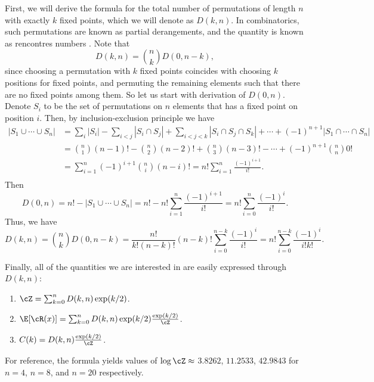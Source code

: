 First, we will derive the formula for the total number of permutations of length $n$ with exactly $k$ fixed points, which we will denote as $D(k, n)$. In combinatorics, such permutations are known as partial derangements, and the quantity is known as rencontres numbers \citep[p.180]{comtet1974advanced}. Note that 
$$D(k, n) = \binom{n}{k}D(0, n-k),$$
since choosing a permutation with $k$ fixed points coincides with choosing $k$ positions for fixed points, and permuting the remaining elements such that there are no fixed points among them. So let us start with derivation of $D(0, n)$. Denote $S_i$ to be the set of permutations on $n$ elements that has a fixed point on position $i$. Then, by inclusion-exclusion principle we have 
\begin{equation*}
\begin{split}
    \left|S_1 \cup \cdots \cup S_n\right| & =\sum_i\left|S_i\right|-\sum_{i<j}\left|S_i \cap S_j\right|+\sum_{i<j<k}\left|S_i \cap S_j \cap S_k\right|+\cdots+(-1)^{n+1}\left|S_1 \cap \cdots \cap S_n\right| \\
    & =\binom{n}{1}(n-1)!-\binom{n}{2}(n-2)!+\binom{n}{3}(n-3)!-\cdots+(-1)^{n+1}\binom{n}{n} 0! \\
    & =\sum_{i=1}^n(-1)^{i+1}\binom{n}{i}(n-i)! = n!\sum_{i=1}^n \frac{(-1)^{i+1}}{i!}.\\
\end{split}
\end{equation*}
Then 
$$D(0, n) = n! - \left|S_1 \cup \cdots \cup S_n\right| = n! - n!\sum_{i=1}^n \frac{(-1)^{i+1}}{i!} = n!\sum_{i=0}^n \frac{(-1)^{i}}{i!}.$$
Thus, we have 
$$D(k, n) = \binom{n}{k}D(0, n - k) = \frac{n!}{k!(n-k)!}(n-k)!\sum_{i=0}^{n-k} \frac{(-1)^{i}}{i!} = n!\sum_{i=0}^{n-k} \frac{(-1)^{i}}{i!k!}.$$

Finally, all of the quantities we are interested in are easily expressed through $D(k, n)$:

\begin{enumerate}
    \item $\cZ = \sum_{k = 0}^n D(k, n)\exp(k/2)$.
    \item $\E[\cR(x)] = \sum_{k = 0}^n D(k, n)\exp(k/2)\frac{\exp(k/2)}{\cZ}$.
    \item $C(k) = D(k, n)\frac{\exp(k/2)}{\cZ}$.
\end{enumerate}

For reference, the formula yields values of $\log \cZ \approx$ $3.8262$, $11.2533$, $42.9843$ for $n=4$, $n=8$, and $n=20$ respectively.

